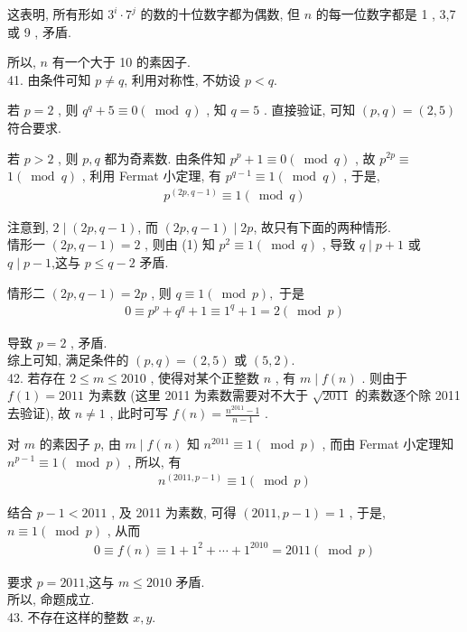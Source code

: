 这表明, 所有形如 $3^{i} \cdot 7^{j}$ 的数的十位数字都为偶数, 但 $n$ 的每一位数字都是 1 , 3,7 或 9 , 矛盾.

所以, $n$ 有一个大于 10 的素因子. \\
41. 由条件可知 $p \neq q$, 利用对称性, 不妨设 $p<q$.

若 $p=2$ , 则 $q^{q}+5 \equiv 0(\bmod q)$ , 知 $q=5$ . 直接验证, 可知 $(p, q)=(2,5)$符合要求.

若 $p>2$ , 则 $p ,  q$ 都为奇素数. 由条件知 $p^{p}+1 \equiv 0(\bmod q)$ , 故 $p^{2 p} \equiv$ $1(\bmod q)$ , 利用 Fermat 小定理, 有 $p^{q-1} \equiv 1(\bmod q)$ , 于是, 
\begin{align*}
	p^{(2 p, q-1)} \equiv 1(\bmod q)
\end{align*}

注意到, $2 \mid(2 p, q-1)$, 而 $(2 p, q-1) \mid 2 p$, 故只有下面的两种情形.\\
情形一 $(2 p, q-1)=2$ , 则由 (1) 知 $p^{2} \equiv 1(\bmod q)$ , 导致 $q \mid p+1$ 或 $q \mid p-1$,这与 $p \leqslant q-2$ 矛盾.

情形二 $(2 p, q-1)=2 p$ , 则 $q \equiv 1(\bmod p) , $ 于是
\begin{align*}
	0 \equiv p^{p}+q^{q}+1 \equiv 1^{q}+1=2(\bmod p)
\end{align*}

导致 $p=2$ , 矛盾.\\
综上可知, 满足条件的 $(p, q)=(2,5)$ 或 $(5,2)$.\\
42. 若存在 $2 \leqslant m \leqslant 2010$ , 使得对某个正整数 $n$ , 有 $m \mid f(n)$ . 则由于 $f(1)=2011$ 为素数 (这里 2011 为素数需要对不大于 $\sqrt{2011}$ 的素数逐个除 2011 去验证), 故 $n \neq 1$ , 此时可写 $f(n)=\frac{n^{2011}-1}{n-1}$ .

对 $m$ 的素因子 $p$, 由 $m \mid f(n)$ 知 $n^{2011} \equiv 1(\bmod p)$ , 而由 Fermat 小定理知 $n^{p-1} \equiv 1(\bmod p)$ , 所以, 有
\begin{align*}
	n^{(2011, p-1)} \equiv 1(\bmod p)
\end{align*}

结合 $p-1<2011$ , 及 2011 为素数, 可得 $(2011, p-1)=1$ , 于是,  $n \equiv 1(\bmod p)$ , 从而
\begin{align*}
	0 \equiv f(n) \equiv 1+1^{2}+\cdots+1^{2010}=2011(\bmod p)
\end{align*}

要求 $p=2011$,这与 $m \leqslant 2010$ 矛盾.\\
所以, 命题成立.\\
43. 不存在这样的整数 $x, y$.

